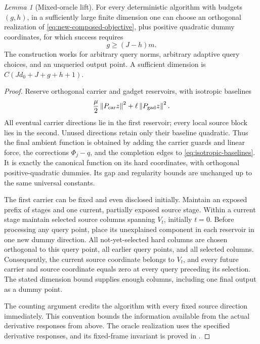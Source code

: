 \documentclass[11pt]{article}
\newtheorem{lemma}[theorem]{Lemma}
\theoremstyle{remark}
\newtheorem{lemma}[lemma]{Lemma}
\theoremstyle{remark}
\newcommand{\norm}[1]{\left\lVert#1\right\rVert}
\begin{document}
\begin{lemma}[Mixed-oracle lift]\label{lem:matrix-lift}
For every deterministic algorithm with budgets $(g,h)$, in a sufficiently large finite dimension one can choose an orthogonal realization of \eqref{eq:new-composed-objective}, plus positive quadratic dummy coordinates, for which success requires
\begin{equation}\label{eq:stage-budget}
 g\ge(J-h)m.
\end{equation}
The construction works for arbitrary query norms, arbitrary adaptive query choices, and an unqueried output point. A sufficient dimension is
$C(Jd_0+J+g+h+1)$.
\end{lemma}
\begin{proof}
Reserve orthogonal carrier and gadget reservoirs, with isotropic baselines
\begin{equation}\label{eq:isotropic-baselines}
 \frac\mu2\norm{P_{\rm car}z}^2+
 \ell\norm{P_{\rm gad}z}^2.
\end{equation}
All eventual carrier directions lie in the first reservoir; every local source block lies in the second. Unused directions retain only their baseline quadratic. Thus the final ambient function is obtained by adding the carrier guards and linear force, the corrections $\Phi_j-q$, and the completion edges to \eqref{eq:isotropic-baselines}. It is exactly the canonical function on its hard coordinates, with orthogonal positive-quadratic dummies. Its gap and regularity bounds are unchanged up to the same universal constants.

The first carrier can be fixed and even disclosed initially. Maintain an exposed prefix of stages and one current, partially exposed source stage. Within a current stage maintain selected source columns spanning $V_t$, initially $t=0$. Before processing any query point, place its unexplained component in each reservoir in one new dummy direction. All not-yet-selected hard columns are chosen orthogonal to this query point, all earlier query points, and all selected columns. Consequently, the current source coordinate belongs to $V_t$, and every future carrier and source coordinate equals zero at every query preceding its selection. The stated dimension bound supplies enough columns, including one final output as a dummy point.

The counting argument credits the algorithm with every fixed source direction immediately. This convention bounds the information available from the actual derivative responses from above. The oracle realization uses the specified derivative responses, and its fixed-frame invariant is proved in .


\end{proof}
\end{document}
